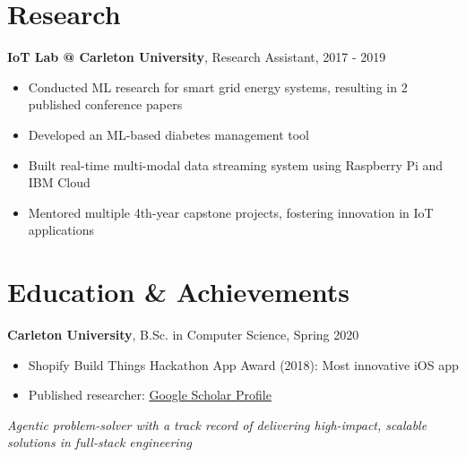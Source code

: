 \documentclass[9pt]{article}
\begin{document}
\section*{Research}
\textbf{IoT Lab @ Carleton University}, Research Assistant, 2017 - 2019
\begin{itemize}
    \setlength\itemsep{0em}
    \item Conducted ML research for smart grid energy systems, resulting in 2 published conference papers
    \item Developed an ML-based diabetes management tool
    \item Built real-time multi-modal data streaming system using Raspberry Pi and IBM Cloud
    \item Mentored multiple 4th-year capstone projects, fostering innovation in IoT applications
\end{itemize}

\section*{Education \& Achievements}
\textbf{Carleton University}, B.Sc. in Computer Science, Spring 2020
\begin{itemize}
    \setlength\itemsep{0em}
    \item Shopify Build Things Hackathon App Award (2018): Most innovative iOS app
    \item Published researcher: \href{https://scholar.google.ca/citations?user=zFDREhgAAAAJ\&hl=en}{Google Scholar Profile}
\end{itemize}

\vspace{-0.5em}
\begin{center}
    \textit{Agentic problem-solver with a track record of delivering high-impact, scalable solutions in full-stack engineering}
\end{center}
\end{document}
